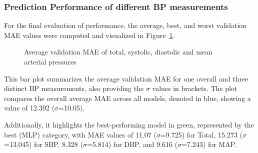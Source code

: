 \newpage

\subsubsection{Prediction Performance of different BP measurements}
\label{subsubsec:bp_prediction_performance}

For the final evaluation of performance, the average, best, and worst validation MAE values were computed and visualized in Figure~\ref{fig:all_mae}.

\begin{figure}[h]
    \centering
    \captionsetup{format=plain, justification=centering, font=small}
    \caption{Average validation MAE of total, systolic, diastolic and mean arterial pressures}
    \label{fig:all_mae}
\end{figure}

This bar plot summarizes the average validation MAE for one overall and three distinct BP measurements, also providing the $\sigma$ values in brackets.
The plot compares the overall average MAE across all models, denoted in blue, showing a value of 12.392 ($\sigma$=10.05).

Additionally, it highlights the best-performing model in green, represented by the best (MLP) category, with MAE values of 11.07 ($\sigma$=9.725) for Total,
15.273 ($\sigma$=13.045) for SBP, 8.328 ($\sigma$=5.814) for DBP, and 9.616 ($\sigma$=7.243) for MAP\@.


